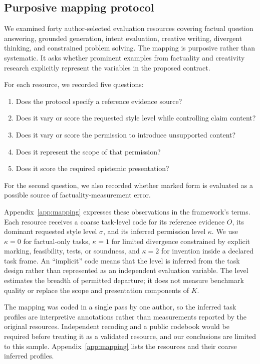 \documentclass{clv2025}
\begin{document}
\subsection{Purposive mapping protocol}

We examined forty author-selected evaluation resources covering factual question answering, grounded generation, intent evaluation, creative writing, divergent thinking, and constrained problem solving.
The mapping is purposive rather than systematic.
It asks whether prominent examples from factuality and creativity research explicitly represent the variables in the proposed contract.

For each resource, we recorded five questions:
\begin{enumerate}
  \item Does the protocol specify a reference evidence source?
  \item Does it vary or score the requested style level while controlling claim content?
  \item Does it vary or score the permission to introduce unsupported content?
  \item Does it represent the scope of that permission?
  \item Does it score the required epistemic presentation?
\end{enumerate}
For the second question, we also recorded whether marked form is evaluated as a possible source of factuality-measurement error.

Appendix~\ref{app:mapping} expresses these observations in the framework's terms.
Each resource receives a coarse task-level code for its reference evidence $O$, its dominant requested style level $\sigma$, and its inferred permission level $\kappa$.
We use $\kappa=0$ for factual-only tasks, $\kappa=1$ for limited divergence constrained by explicit marking, feasibility, tests, or soundness, and $\kappa=2$ for invention inside a declared task frame.
An ``implicit'' code means that the level is inferred from the task design rather than represented as an independent evaluation variable.
The level estimates the breadth of permitted departure; it does not measure benchmark quality or replace the scope and presentation components of $K$.

The mapping was coded in a single pass by one author, so the inferred task profiles are interpretive annotations rather than measurements reported by the original resources.
Independent recoding and a public codebook would be required before treating it as a validated resource, and our conclusions are limited to this sample.
Appendix~\ref{app:mapping} lists the resources and their coarse inferred profiles.
\end{document}
